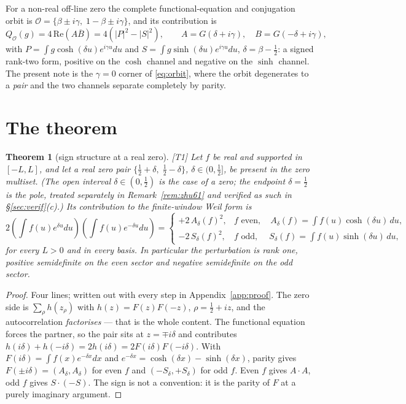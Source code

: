\documentclass[11pt,a4paper]{article}
\newtheorem{theorem}{Theorem}
\theoremstyle{remark}
\newcommand{\tier}[1]{{\small\textsf{[#1]}}}
\newcommand{\Ad}{A_\delta}
\newcommand{\Sd}{S_\delta}
\begin{document}
For a non-real off-line zero the complete functional-equation and conjugation orbit is
$\mathcal{O}=\{\beta\pm i\gamma,\;1-\beta\pm i\gamma\}$, and its contribution
is~\cite[eq.~(4)]{DHnote}
\begin{equation}\label{eq:orbit}
Q_{\mathcal O}(g)=4\,\mathrm{Re}\!\left(A\overline{B}\right)=4\left(|P|^2-|S|^2\right),
\qquad A=G(\delta+i\gamma),\quad B=G(-\delta+i\gamma),
\end{equation}
with $P=\int g\cosh(\delta u)e^{i\gamma u}du$ and $S=\int g\sinh(\delta u)e^{i\gamma u}du$,
$\delta=\beta-\tfrac12$: a signed rank-two form, positive on the $\cosh$ channel and
negative on the $\sinh$ channel. The present note is the $\gamma=0$ corner of
\eqref{eq:orbit}, where the orbit degenerates to a \emph{pair} and the two channels
separate completely by parity.

\section{The theorem}\label{sec:thm}

\begin{theorem}[sign structure at a real zero]\label{thm:sign}\tier{T1}
Let $f$ be real and supported in $[-L,L]$, and let a real zero pair
$\{\tfrac12+\delta,\;\tfrac12-\delta\}$, $\delta\in(0,\tfrac12]$, be present in the zero
multiset. (The open interval $\delta\in(0,\tfrac12)$ is the case of a \emph{zero}; the
endpoint $\delta=\tfrac12$ is the \emph{pole}, treated separately in
Remark~\ref{rem:zhu61} and verified as such in \S\ref{sec:verif}(c).) Its contribution to the finite-window Weil form is
\[
2\left(\int f(u)e^{\delta u}du\right)\left(\int f(u)e^{-\delta u}du\right)
=\begin{cases}
+2\,\Ad(f)^2, & f \text{ even},\quad \Ad(f)=\displaystyle\int f(u)\cosh(\delta u)\,du,\\[4pt]
-2\,\Sd(f)^2, & f \text{ odd},\quad\ \Sd(f)=\displaystyle\int f(u)\sinh(\delta u)\,du,
\end{cases}
\]
for every $L>0$ and in every basis. In particular the perturbation is rank one, positive
semidefinite on the even sector and negative semidefinite on the odd sector.
\end{theorem}

\begin{proof}
Four lines; written out with every step in Appendix~\ref{app:proof}. The zero side is
$\sum_\rho h(z_\rho)$ with $h(z)=F(z)F(-z)$, $\rho=\tfrac12+iz$, and the autocorrelation
\emph{factorises} --- that is the whole content. The functional equation forces the partner,
so the pair sits at $z=\mp i\delta$ and contributes
$h(i\delta)+h(-i\delta)=2h(i\delta)=2F(i\delta)F(-i\delta)$. With
$F(i\delta)=\int f(x)e^{-\delta x}dx$ and
$e^{-\delta x}=\cosh(\delta x)-\sinh(\delta x)$, parity gives
$F(\pm i\delta)=(\Ad,\Ad)$ for even $f$ and $(-\Sd,+\Sd)$ for odd $f$. Even $f$ gives
$A\cdot A$, odd $f$ gives $S\cdot(-S)$. The sign is not a convention: it is the parity of
$F$ at a purely imaginary argument.
\end{proof}
\end{document}
